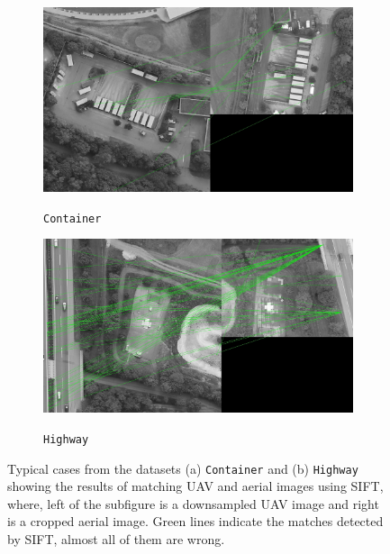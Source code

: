 \begin{figure}[tbp]
    \centering
       \begin{subfigure}[b]{0.47\columnwidth}
           \centering
           \includegraphics[width=\columnwidth]{figures_1/container_sift.JPG}
           \caption[]{\texttt{Container}}%
           {{\small }}
           \label{fig:failure_container}
       \end{subfigure}
       \hfill
       \begin{subfigure}[b]{0.5\columnwidth}  
           \centering 
           \includegraphics[width=\columnwidth]{figures_1/highway_sift.JPG}
           \caption[]{\texttt{Highway}}%
           {{\small }}    
           \label{fig:failure_highway}
       \end{subfigure}
       \caption{Typical cases from the datasets (a) \texttt{Container} and (b) \texttt{Highway} showing the results of matching UAV and aerial images using SIFT, where, left of the subfigure is a downsampled UAV image and right is a cropped aerial image. Green lines indicate the matches detected by SIFT, almost all of them are wrong.}
        \label{fig:failure}
\end{figure}

